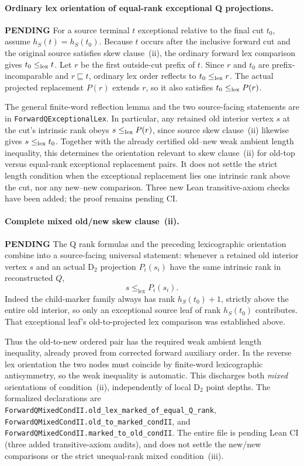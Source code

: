 \documentclass[11pt]{article}
\newcommand{\todo}{\textcolor{gray!70!black}{\textbf{PENDING}}}
\newcommand{\lean}[1]{\texttt{#1}}
\begin{document}
\paragraph{Ordinary lex orientation of equal-rank exceptional Q projections.} \todo
For a source terminal $t$ exceptional relative to the final cut
$t_0$, assume $h_S(t)=h_S(t_0)$. Because $t$ occurs after the
inclusive forward cut and the original source satisfies skew
clause~(ii), the ordinary forward lex comparison gives
$t_0\le_{\rm lex}t$.
Let $r$ be the first outside-cut prefix of $t$.
Since $r$ and $t_0$ are prefix-incomparable and
$r\sqsubseteq t$, ordinary lex order reflects to
$t_0\le_{\rm lex}r$. The actual projected replacement
$P(r)$ extends $r$, so it also satisfies
$t_0\le_{\rm lex}P(r)$.

The general finite-word reflection lemma and the two
source-facing statements are in
\lean{ForwardQExceptionalLex}. In particular, any retained
old interior vertex $s$ at the cut's intrinsic rank obeys
$s\le_{\rm lex}P(r)$, since source skew clause~(ii) likewise
gives $s\le_{\rm lex}t_0$.
Together with the already certified old--new weak ambient
length inequality, this determines the orientation relevant
to skew clause~(ii) for old-top versus equal-rank exceptional
replacement pairs. It does not settle the strict length
condition when the exceptional replacement lies one intrinsic
rank above the cut, nor any new--new comparison.
Three new Lean transitive-axiom checks have been added;
the proof remains pending CI.


\paragraph{Complete mixed old/new skew clause~(ii).} \todo
The Q rank formulas and the preceding lexicographic orientation
combine into a source-facing universal statement: whenever a
retained old interior vertex $s$ and an actual D$_2$ projection
$P_i(s_i)$ have the same intrinsic rank in reconstructed $Q$,
\[
 s\le_{\mathrm{lex}} P_i(s_i).
\]
Indeed the child-marker family always has rank $h_S(t_0)+1$,
strictly above the entire old interior, so only an exceptional
source leaf of rank $h_S(t_0)$ contributes. That exceptional
leaf's old-to-projected lex comparison was established above.

Thus the old-to-new ordered pair has the required weak ambient
length inequality, already proved from corrected forward auxiliary
order. In the reverse lex orientation the two nodes must coincide
by finite-word lexicographic antisymmetry, so the weak inequality
is automatic. This discharges both \emph{mixed} orientations of
condition~(ii), independently of local D$_2$ point depths.
The formalized declarations are
\lean{ForwardQMixedCondII.old\_lex\_marked\_of\_equal\_Q\_rank},
\lean{ForwardQMixedCondII.old\_to\_marked\_condII}, and
\lean{ForwardQMixedCondII.marked\_to\_old\_condII}.
The entire file is pending Lean CI (three added transitive-axiom
audits), and does not settle the new/new comparisons or the
strict unequal-rank mixed condition~(iii).
\end{document}
